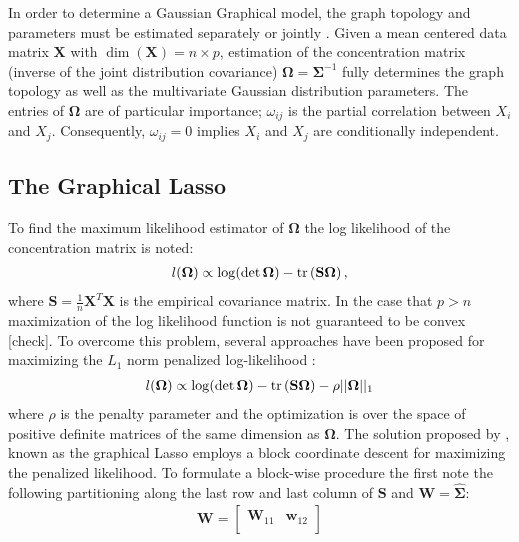 \begin{DoubleSpace*}
In order to determine a Gaussian Graphical model, the graph topology and parameters must be estimated separately \cite{meinshausen2006} or jointly \cite{friedman2007,yuan2007,banerjee2008}. Given a mean centered data matrix $\textbf{X}$ with $\dim(\textbf{X})=n\times p$, estimation of the concentration matrix (inverse of the joint distribution covariance) $\boldsymbol{\Omega}=\boldsymbol{\Sigma}^{-1}$ fully determines the graph topology as well as the multivariate Gaussian distribution parameters. The entries of $\boldsymbol{\Omega}$ are of particular importance; $\omega_{ij}$ is the partial correlation between $X_i$ and $X_j$. Consequently, $\omega_{ij}=0$ implies $X_i$ and $X_j$ are conditionally independent.

\subsection{The Graphical Lasso}
To find the maximum likelihood estimator of $\boldsymbol{\Omega}$ the log likelihood of the concentration matrix is noted:
\begin{align} 
l(\boldsymbol{\Omega})\propto\log (\det \boldsymbol{\Omega})-\operatorname{tr} \left( \textbf{S} \boldsymbol{\Omega} \right),
\end{align}
where $\textbf{S}=\frac{1}{n}\textbf{X}^T \textbf{X}$ is the empirical covariance matrix. In the case that $p>n$ maximization of the log likelihood function is not guaranteed to be convex [check]. To overcome this problem, several approaches have been proposed for maximizing the $L_1$ norm penalized log-likelihood \cite{friedman2007,yuan2007,banerjee2008}:
\begin{align}
l(\boldsymbol{\Omega})\propto\log (\det \boldsymbol{\Omega})-\operatorname{tr} \left( \textbf{S} \boldsymbol{\Omega} \right)-\rho ||\boldsymbol{\Omega}||_1
\label{eq:likelihood}
\end{align}
where $\rho$ is the penalty parameter and the optimization is over the space of positive definite matrices of the same dimension as $\boldsymbol{\Omega}$.
The solution proposed by \cite{friedman2007}, known as the graphical Lasso employs a block coordinate descent for maximizing the penalized likelihood. To formulate a block-wise procedure the \cite{friedman2007} first note the following partitioning along the last row and last column of $\textbf{S}$ and $\textbf{W}=\hat{\boldsymbol{\Sigma}}$:
\begin{align}
\textbf{W}=
\begin{bmatrix}
\textbf{W}_{11} & \textbf{w}_{12} \\

\end{bmatrix}
\end{align}
\end{DoubleSpace*}
